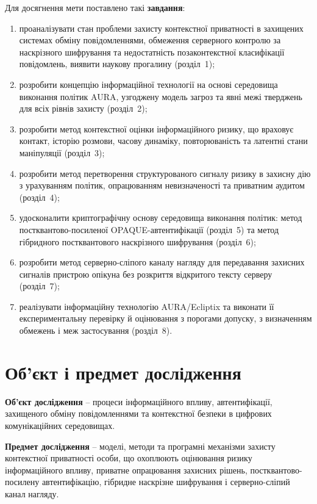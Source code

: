 \medskip
\noindent Для досягнення мети поставлено такі \textbf{завдання}:

\begin{enumerate}
  \item проаналізувати стан проблеми захисту контекстної приватності в захищених системах обміну повідомленнями, обмеження серверного контролю за наскрізного шифрування та недостатність позаконтекстної класифікації повідомлень, виявити наукову прогалину (розділ~1);
  \item розробити концепцію інформаційної технології на основі середовища виконання політик AURA, узгоджену модель загроз та явні межі тверджень для всіх рівнів захисту (розділ~2);
  \item розробити метод контекстної оцінки інформаційного ризику, що враховує контакт, історію розмови, часову динаміку, повторюваність та латентні стани маніпуляції (розділ~3);
  \item розробити метод перетворення структурованого сигналу ризику в захисну дію з урахуванням політик, опрацюванням невизначеності та приватним аудитом (розділ~4);
  \item удосконалити криптографічну основу середовища виконання політик: метод постквантово-посиленої OPAQUE-автентифікації (розділ~5) та метод гібридного постквантового наскрізного шифрування (розділ~6);
  \item розробити метод серверно-сліпого каналу нагляду для передавання захисних сигналів пристрою опікуна без розкриття відкритого тексту серверу (розділ~7);
  \item реалізувати інформаційну технологію AURA/Ecliptix та виконати її експериментальну перевірку й оцінювання з порогами допуску, з визначенням обмежень і меж застосування (розділ~8).
\end{enumerate}

\section*{Об'єкт і предмет дослідження}

\textbf{Об'єкт дослідження} -- процеси інформаційного впливу, автентифікації, захищеного обміну повідомленнями та контекстної безпеки в цифрових комунікаційних середовищах.

\medskip
\noindent\textbf{Предмет дослідження} -- моделі, методи та програмні механізми захисту контекстної приватності особи, що охоплюють оцінювання ризику інформаційного впливу, приватне опрацювання захисних рішень, постквантово-посилену автентифікацію, гібридне наскрізне шифрування і серверно-сліпий канал нагляду.


